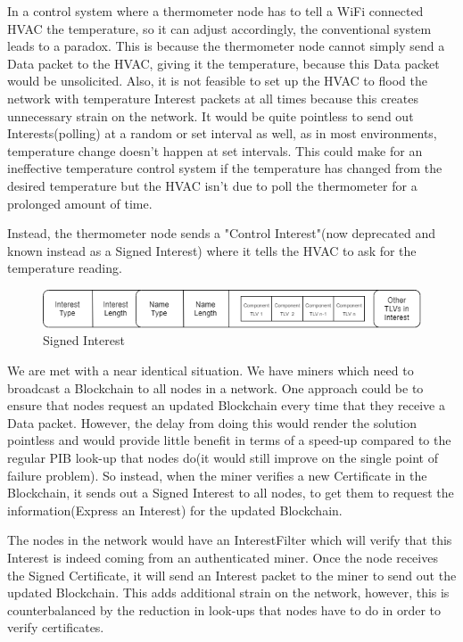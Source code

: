 In a control system where a thermometer node has to tell a WiFi connected HVAC the temperature, so it can adjust accordingly, the conventional system leads to a paradox. This is because the thermometer node cannot simply send a Data packet to the HVAC, giving it the temperature, because this Data packet would be unsolicited. Also, it is not feasible to set up the HVAC to flood the network with temperature Interest packets at all times because this creates unnecessary strain on the network. It would be quite pointless to send out Interests(polling) at a random or set interval as well, as in most environments, temperature change doesn't happen at set intervals. This could make for an ineffective temperature control system if the temperature has changed from the desired temperature but the HVAC isn't due to poll the thermometer for a prolonged amount of time. \par 
Instead, the thermometer node sends a "Control Interest"(now deprecated and known instead as a Signed Interest) where it tells the HVAC to ask for the temperature reading.\par 
\begin{figure}
\includegraphics[width=6in]{signedinterest.png}
\caption{Signed Interest}
\end{figure}
We are met with a near identical situation. We have miners which need to broadcast a Blockchain to all nodes in a network. One approach could be to ensure that nodes request an updated Blockchain every time that they receive a Data packet. However, the delay from doing this would render the solution pointless and would provide little benefit in terms of a speed-up compared to the regular PIB look-up that nodes do(it would still improve on the single point of failure problem). So instead, when the miner verifies a new Certificate in the Blockchain, it sends out a Signed Interest to all nodes, to get them to request the information(Express an Interest) for the updated Blockchain. \par

The nodes in the network would have an InterestFilter which will verify that this Interest is indeed coming from an authenticated miner. Once the node receives the Signed Certificate, it will send an Interest packet to the miner to send out the updated Blockchain. This adds additional strain on the network, however, this is counterbalanced by the reduction in look-ups that nodes have to do in order to verify certificates.